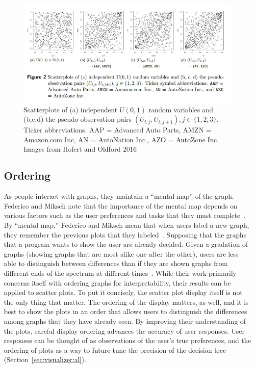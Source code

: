 \begin{figure}[htb]
	\begin{center}
		\includegraphics[width=0.75\linewidth]{ch-visualizer/figures/hofertoldford}
		\caption[Scatterplots of independent $U(0,1)$ random variables and the pseudo-observation pairs $(U_{t,j},U_{t,j+1}),j\in \{1,2,3\}$.]{Scatterplots of (a) independent $U(0,1)$ random variables and (b,c,d) the pseudo-observation pairs $(U_{t,j},U_{t,j+1}),j\in \{1,2,3\}$. Ticker abbreviations: AAP = Advanced Auto Parts, AMZN = Amazon.com Inc, AN = AutoNation Inc., AZO = AutoZone Inc. Images from Hofert and Oldford 2016~\cite{hofert2016}}
		\label{fig:visualizer:hofertoldford}
	\end{center}
\end{figure}

\subsection{Ordering}
\label{sec:visualizer:scatterplot:ordering}

As people interact with graphs, they maintain a ``mental map'' of the graph. Federico and Miksch note that the importance of the mental map depends on various factors such as the user preferences and tasks that they must complete~\cite{federico2016}. By ``mental map,'' Federico and Miksch mean that when users label a new graph, they remember the previous plots that they labeled~\cite{federico2016}. Supposing that the graphs that a program wants to show the user are already decided. Given a gradation of graphs (showing graphs that are most alike one after the other), users are less able to distinguish between differences than if they are shown graphs from different ends of the spectrum at different times~\cite{federico2016}. While their work primarily concerns itself with ordering graphs for interpretability, their results can be applied to scatter plots. To put it concisely, the scatter plot display itself is not the only thing that matter. The ordering of the display matters, as well, and it is best to show the plots in an order that allows users to distinguish the differences among graphs that they have already seen. By improving their understanding of the plots, careful display ordering advances the accuracy of user responses. User responses can be thought of as observations of the user’s true preferences, and the ordering of plots as a way to future tune the precision of the decision tree (Section~\ref{sec:visualizer:al}). 

